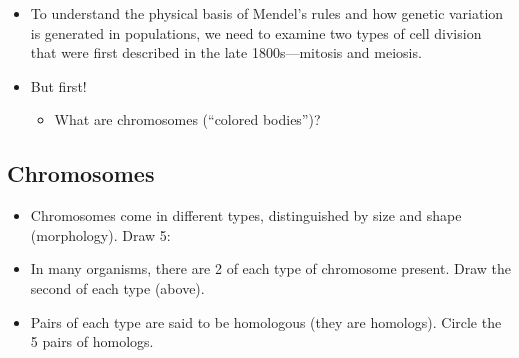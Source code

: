 \begin{frame}
    \begin{itemize}
        \item To understand the physical basis of Mendel's rules and how
            genetic variation is generated in populations, we need to examine
            two types of cell division that were first described in the late
            1800s---mitosis and meiosis. 

            \vspace{5mm}
        \item But first!
            \begin{itemize}
                \item What are chromosomes (``colored bodies'')?
            \end{itemize}
    \end{itemize}
\end{frame}

\subsection{Chromosomes}

\begin{frame}
    \begin{itemize}
        \item Chromosomes come in different types, distinguished by size and
            shape (morphology). Draw 5:
        \vspace{4cm}
        \item In many organisms, there are 2 of each type of chromosome
            present. Draw the second of each type (above).
        \item Pairs of each type are said to be homologous (they are homologs).
            Circle the 5 pairs of homologs.
    \end{itemize}

\end{frame}


